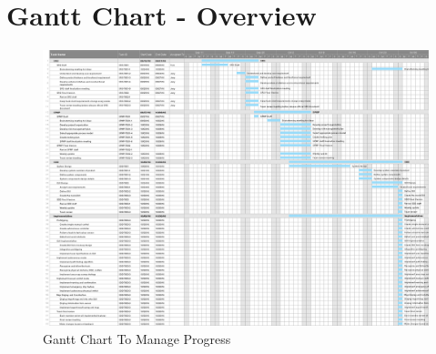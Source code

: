 \appendix
\section{Gantt Chart - Overview}
\begin{figure}[H]
	\centering
	\hspace*{-1.3in}
	\includegraphics[width=1.5\linewidth]{gantt-chart.png}  %
	\caption{Gantt Chart To Manage Progress}
	\label{gantt-chart-overview}
\end{figure}

%
